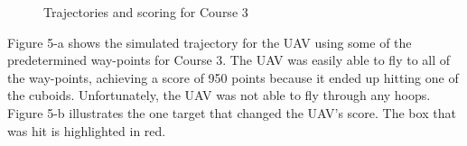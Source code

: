 \documentclass[12pt]{article}
\begin{document}
\begin{figure}[H]
	\caption{Trajectories and scoring for Course 3}
\end{figure}
Figure 5-a shows the simulated trajectory for the UAV using some of the predetermined way-points for Course 3. The UAV was easily able to fly to all of the way-points, achieving a score of 950 points because it ended up hitting one of the cuboids. Unfortunately, the UAV was not able to fly through any hoops. Figure 5-b illustrates the one target that changed the UAV's score. The box that was hit is highlighted in red. 
\\
\end{document}
